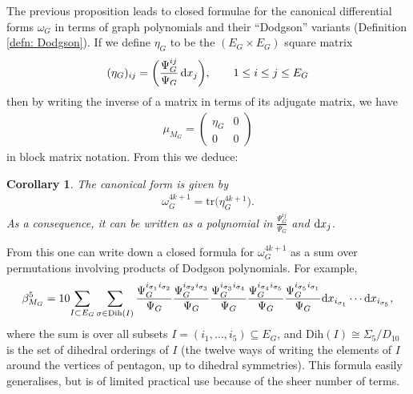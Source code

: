 \documentclass[pdftex]{sigma}%
\newtheorem{cor}[thm]{Corollary}
\numberwithin{equation}{section}
\newcommand{\tr}{\mathrm{tr}}
\newcommand{\0}{\color{blue}{\mathsf{0}}}
\begin{document}
The previous proposition leads to closed formulae for the canonical differential forms $\omega_G$ in terms of graph polynomials and their ``Dodgson'' variants (Definition \ref{defn: Dodgson}).
If we define $\eta_{G}$ to be the $(E_G \times E_G)$ square matrix
 \begin{gather*}
 (\eta_{G})_{ij} = \bigg(\frac{\Psi_G^{ij}}{\Psi_G} \, {\rm d} x_j\bigg), \qquad 1 \leq i \leq j \leq E_G
 \end{gather*}
then by writing the inverse of a matrix in terms of its adjugate matrix, we have
\begin{gather*} %
\mu_{M_G} =
\begin{pmatrix}
\eta_{G} & 0 \\ 0 & 0
\end{pmatrix}
\end{gather*}
in block matrix notation. From this we deduce:

\begin{cor}The canonical form is given by
\begin{gather*}
\omega^{4k+1}_G = \tr \big(\eta_G^{4k+1}\big).
\end{gather*}
As a consequence, it can be written as a polynomial in $\frac{\Psi^{ij}_G}{\Psi_G}$ and ${\rm d}x_j$.
\end{cor}
From this one can write down a closed formula for $\omega^{4k+1}_G$ as a sum over permutations involving products of Dodgson polynomials. For example,
\begin{gather*} %
\beta^5_{M_G} = 10\! \sum_{I \subset E_G} \sum_{\sigma \in \mathrm{Dih}(I)} \frac{\Psi_G^{i_{\sigma_1} i_{\sigma_2}} }{\Psi_G} \frac{\Psi_G^{i_{\sigma_2} i_{\sigma_3}}}{\Psi_G} \frac{\Psi_G^{i_{\sigma_3} i_{\sigma_4}}}{\Psi_G} \frac{\Psi_G^{i_{\sigma_4} i_{\sigma_5}}}{\Psi_G} \frac{\Psi_G^{i_{\sigma_5} i_{\sigma_1}}}{\Psi_G} {\rm d}x_{i_{\sigma_1}} \cdots {\rm d}x_{i_{\sigma_5}},
\end{gather*}
where the sum is over all subsets $I=(i_1,\dots, i_5) \subseteq E_G$, and $\mathrm{Dih}(I) \cong \Sigma_5 /D_{10}$ is the set of dihedral orderings of $I$ (the twelve ways of writing the elements of $I$ around the vertices of pentagon, up to dihedral symmetries). This formula easily generalises, but is of limited practical use because of the sheer number of terms.
\end{document}
